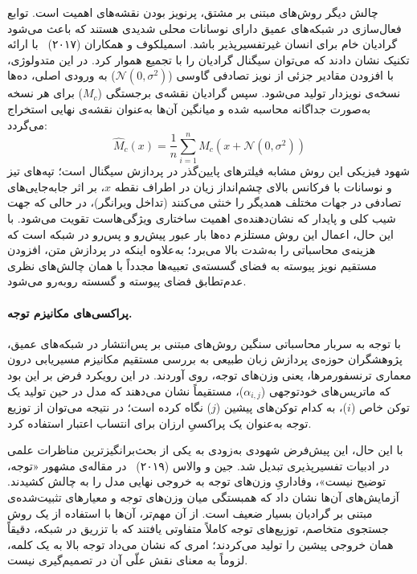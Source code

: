 چالش دیگر روش‌های مبتنی بر مشتق، پرنویز بودن نقشه‌های اهمیت است. توابع فعال‌سازی در شبکه‌های عمیق دارای نوسانات محلی شدیدی هستند که باعث می‌شود گرادیان خام برای انسان غیرتفسیرپذیر باشد. اسمیلکوف و همکاران (۲۰۱۷)~\cite{smilkov2017smoothgrad} با ارائه تکنیک  نشان دادند که می‌توان سیگنال گرادیان را با تجمیع هموار کرد. در این متدولوژی، با افزودن مقادیر جزئی از نویز تصادفی گاوسی ($\mathcal{N}(0, \sigma^2)$) به ورودی اصلی، ده‌ها نسخه‌ی نویزدار تولید می‌شود. سپس گرادیان نقشه‌ی برجستگی ($M_c$) برای هر نسخه به‌صورت جداگانه محاسبه شده و میانگین آن‌ها به‌عنوان نقشه‌ی نهایی استخراج می‌گردد:
\begin{equation}\label{eq:chap3_smoothgrad}
    \hat{M}_c(x)=\frac{1}{n}\sum_{i=1}^n M_c(x+\mathcal{N}(0,\sigma^2))
\end{equation}
شهود فیزیکی این روش مشابه فیلترهای پایین‌گذر در پردازش سیگنال است؛ تپه‌های تیز و نوسانات با فرکانس بالای چشم‌انداز زیان در اطراف نقطه $x$، بر اثر جابه‌جایی‌های تصادفی در جهات مختلف همدیگر را خنثی می‌کنند (تداخل ویرانگر)، در حالی که جهت شیب کلی و پایدار که نشان‌دهنده‌ی اهمیت ساختاری ویژگی‌هاست تقویت می‌شود. با این حال، اعمال این روش مستلزم ده‌ها بار عبور پیش‌رو و پس‌رو در شبکه است که هزینه‌ی محاسباتی را به‌شدت بالا می‌برد؛ به‌علاوه اینکه در پردازش متن، افزودن مستقیم نویز پیوسته به فضای گسسته‌ی تعبیه‌ها مجدداً با همان چالش‌های نظری عدم‌تطابق فضای پیوسته و گسسته روبه‌رو می‌شود.

\paragraph{پراکسی‌های مکانیزم توجه.}

با توجه به سربار محاسباتی سنگین روش‌های مبتنی بر پس‌انتشار در شبکه‌های عمیق، پژوهشگران حوزه‌ی پردازش زبان طبیعی به بررسی مستقیم مکانیزم مسیریابی درون معماری ترنسفورمرها، یعنی وزن‌های توجه، روی آوردند. در این رویکرد فرض بر این بود که ماتریس‌های خودتوجهی ($\alpha_{i,j}$)، مستقیماً نشان می‌دهند که مدل در حین تولید یک توکن خاص ($i$)، به کدام توکن‌های پیشین ($j$) نگاه کرده است؛ در نتیجه می‌توان از توزیع توجه به‌عنوان یک پراکسیِ ارزان برای انتساب اعتبار استفاده کرد.

با این حال، این پیش‌فرض شهودی به‌زودی به یکی از بحث‌برانگیزترین مناظرات علمی در ادبیات تفسیرپذیری تبدیل شد. جین و والاس (۲۰۱۹)~\cite{jain2019attention} در مقاله‌ی مشهور «توجه، توضیح نیست»، وفاداریِ وزن‌های توجه به خروجی نهایی مدل را به چالش کشیدند. آزمایش‌های آن‌ها نشان داد که همبستگی میان وزن‌های توجه و معیارهای تثبیت‌شده‌ی مبتنی بر گرادیان بسیار ضعیف است. از آن مهم‌تر، آن‌ها با استفاده از یک روش جستجوی متخاصم، توزیع‌های توجه کاملاً متفاوتی یافتند که با تزریق در شبکه، دقیقاً همان خروجی پیشین را تولید می‌کردند؛ امری که نشان می‌داد توجه بالا به یک کلمه، لزوماً به معنای نقش علّی آن در تصمیم‌گیری نیست.

